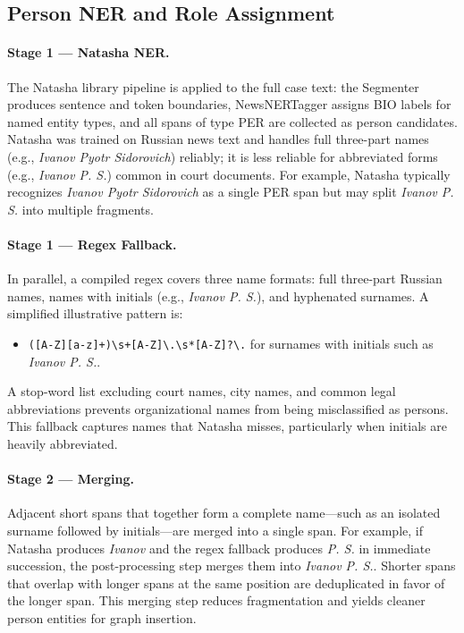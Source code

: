 \documentclass[11pt]{article}
\begin{document}
\subsection{Person NER and Role Assignment}

\paragraph{Stage 1 --- Natasha NER.}

The Natasha library pipeline is applied to the full case text: the Segmenter produces sentence and token boundaries, NewsNERTagger assigns BIO labels for named entity types, and all spans of type PER are collected as person candidates. Natasha was trained on Russian news text and handles full three-part names (e.g., \textit{Ivanov Pyotr Sidorovich}) reliably; it is less reliable for abbreviated forms (e.g., \textit{Ivanov P. S.}) common in court documents. For example, Natasha typically recognizes \textit{Ivanov Pyotr Sidorovich} as a single PER span but may split \textit{Ivanov P. S.} into multiple fragments.

\paragraph{Stage 1 --- Regex Fallback.}

In parallel, a compiled regex covers three name formats: full three-part Russian names, names with initials (e.g., \textit{Ivanov P. S.}), and hyphenated surnames. A simplified illustrative pattern is:
\begin{itemize}
\item \verb|([A-Z][a-z]+)\s+[A-Z]\.\s*[A-Z]?\.| for surnames with initials such as \textit{Ivanov P. S.}.
\end{itemize}
A stop-word list excluding court names, city names, and common legal abbreviations prevents organizational names from being misclassified as persons. This fallback captures names that Natasha misses, particularly when initials are heavily abbreviated.

\paragraph{Stage 2 --- Merging.}

Adjacent short spans that together form a complete name---such as an isolated surname followed by initials---are merged into a single span. For example, if Natasha produces \textit{Ivanov} and the regex fallback produces \textit{P. S.} in immediate succession, the post-processing step merges them into \textit{Ivanov P. S.}. Shorter spans that overlap with longer spans at the same position are deduplicated in favor of the longer span. This merging step reduces fragmentation and yields cleaner person entities for graph insertion.
\end{document}
